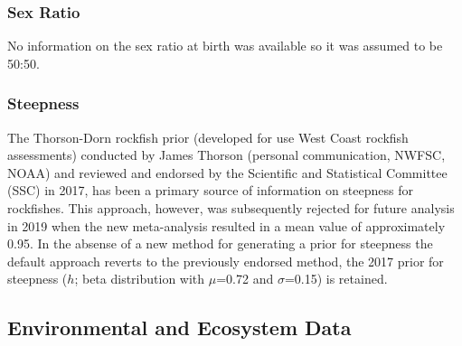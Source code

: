 \documentclass[11pt,
  english,
  a4paper,
]{article}
\begin{document}
\leavevmode\tagmcend\tagstructend\par


\hypertarget{sex-ratio}{%
\subsubsection{Sex Ratio}\label{sex-ratio}}

\leavevmode\tagmcend\tagstructend


No information on the sex ratio at birth was available so it was assumed to be 50:50.

\leavevmode\tagmcend\tagstructend\par


\hypertarget{steepness}{%
\subsubsection{Steepness}\label{steepness}}

\leavevmode\tagmcend\tagstructend


The Thorson-Dorn rockfish prior (developed for use West Coast rockfish assessments) conducted by James Thorson (personal communication, NWFSC, NOAA) and reviewed and endorsed by the Scientific and Statistical Committee (SSC) in 2017, has been a primary source of information on steepness for rockfishes. This approach, however, was subsequently rejected for future analysis in 2019 when the new meta-analysis resulted in a mean value of approximately 0.95. In the absense of a new method for generating a prior for steepness the default approach reverts to the previously endorsed method, the 2017 prior for steepness ({\(h\)\leavevmode\tagmcend\tagstructend}; beta distribution with {\(\mu\)\leavevmode\tagmcend\tagstructend}=0.72 and {\(\sigma\)\leavevmode\tagmcend\tagstructend}=0.15) is retained.

\leavevmode\tagmcend\tagstructend\par


\hypertarget{environmental-and-ecosystem-data}{%
\subsection{Environmental and Ecosystem Data}\label{environmental-and-ecosystem-data}}
\end{document}
